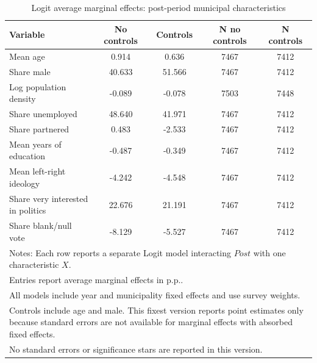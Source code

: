 \begin{table}[!htbp]
\centering
\caption{Logit average marginal effects: post-period municipal characteristics}
\label{tab:logit_post_x_mfx}
\small
\begin{tabular}{lcccc}
\hline
Variable & No controls & Controls & N no controls & N controls \\
\hline
Mean age & 0.914 & 0.636 & 7467 & 7412 \\
Share male & 40.633 & 51.566 & 7467 & 7412 \\
Log population density & -0.089 & -0.078 & 7503 & 7448 \\
Share unemployed & 48.640 & 41.971 & 7467 & 7412 \\
Share partnered & 0.483 & -2.533 & 7467 & 7412 \\
Mean years of education & -0.487 & -0.349 & 7467 & 7412 \\
Mean left-right ideology & -4.242 & -4.548 & 7467 & 7412 \\
Share very interested in politics & 22.676 & 21.191 & 7467 & 7412 \\
Share blank/null vote & -8.129 & -5.527 & 7467 & 7412 \\
\hline
\multicolumn{5}{l}{\footnotesize Notes: Each row reports a separate Logit model interacting $Post$ with one characteristic $X$.} \\
\multicolumn{5}{l}{\footnotesize Entries report average marginal effects in p.p..} \\
\multicolumn{5}{l}{\footnotesize All models include year and municipality fixed effects and use survey weights.} \\
\multicolumn{5}{l}{\footnotesize Controls include age and male. This fixest version reports point estimates only because standard errors are not available for marginal effects with absorbed fixed effects.} \\
\multicolumn{5}{l}{\footnotesize No standard errors or significance stars are reported in this version.} \\
\end{tabular}
\end{table}
